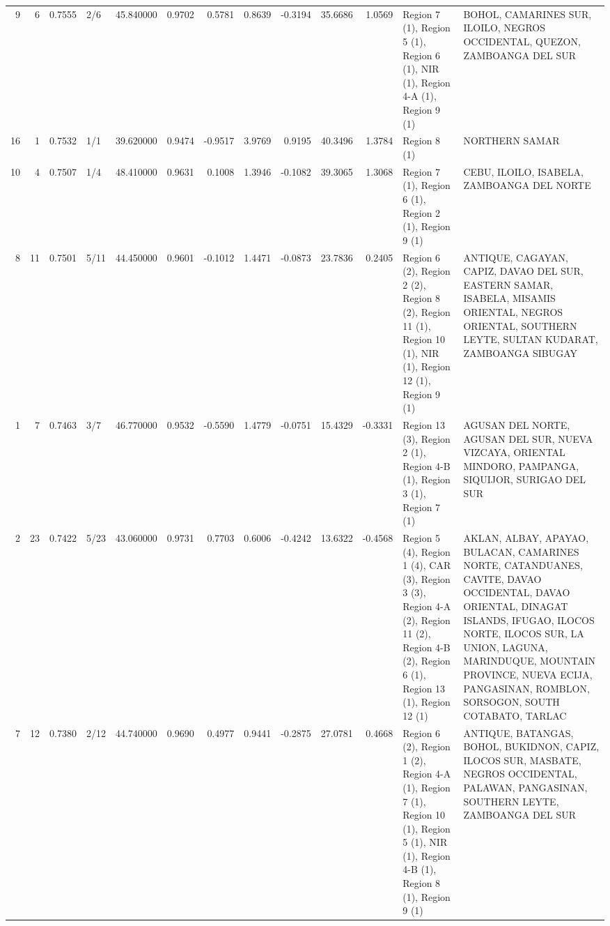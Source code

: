 \begin{tabular}{rrrlrrrrrrrll}
9 & 6 & {\cellcolor[HTML]{E1DAD6}} \color[HTML]{000000} 0.7555 & 2/6 & {\cellcolor[HTML]{F39577}} \color[HTML]{000000} 45.840000 & 0.9702 & 0.5781 & 0.8639 & -0.3194 & 35.6686 & 1.0569 & Region 7 (1), Region 5 (1), Region 6 (1), NIR (1), Region 4-A (1), Region 9 (1) & BOHOL, CAMARINES SUR, ILOILO, NEGROS OCCIDENTAL, QUEZON, ZAMBOANGA DEL SUR \\
16 & 1 & {\cellcolor[HTML]{DDDCDC}} \color[HTML]{000000} 0.7532 & 1/1 & {\cellcolor[HTML]{D3DBE7}} \color[HTML]{000000} 39.620000 & 0.9474 & -0.9517 & 3.9769 & 0.9195 & 40.3496 & 1.3784 & Region 8 (1) & NORTHERN SAMAR \\
10 & 4 & {\cellcolor[HTML]{D9DCE1}} \color[HTML]{000000} 0.7507 & 1/4 & {\cellcolor[HTML]{DA5A49}} \color[HTML]{F1F1F1} 48.410000 & 0.9631 & 0.1008 & 1.3946 & -0.1082 & 39.3065 & 1.3068 & Region 7 (1), Region 6 (1), Region 2 (1), Region 9 (1) & CEBU, ILOILO, ISABELA, ZAMBOANGA DEL NORTE \\
8 & 11 & {\cellcolor[HTML]{D7DCE3}} \color[HTML]{000000} 0.7501 & 5/11 & {\cellcolor[HTML]{F7AF91}} \color[HTML]{000000} 44.450000 & 0.9601 & -0.1012 & 1.4471 & -0.0873 & 23.7836 & 0.2405 & Region 6 (2), Region 2 (2), Region 8 (2), Region 11 (1), Region 10 (1), NIR (1), Region 12 (1), Region 9 (1) & ANTIQUE, CAGAYAN, CAPIZ, DAVAO DEL SUR, EASTERN SAMAR, ISABELA, MISAMIS ORIENTAL, NEGROS ORIENTAL, SOUTHERN LEYTE, SULTAN KUDARAT, ZAMBOANGA SIBUGAY \\
1 & 7 & {\cellcolor[HTML]{D1DAE9}} \color[HTML]{000000} 0.7463 & 3/7 & {\cellcolor[HTML]{EC8165}} \color[HTML]{F1F1F1} 46.770000 & 0.9532 & -0.5590 & 1.4779 & -0.0751 & 15.4329 & -0.3331 & Region 13 (3), Region 2 (1), Region 4-B (1), Region 3 (1), Region 7 (1) & AGUSAN DEL NORTE, AGUSAN DEL SUR, NUEVA VIZCAYA, ORIENTAL MINDORO, PAMPANGA, SIQUIJOR, SURIGAO DEL SUR \\
2 & 23 & {\cellcolor[HTML]{C7D7F0}} \color[HTML]{000000} 0.7422 & 5/23 & {\cellcolor[HTML]{F5C4AC}} \color[HTML]{000000} 43.060000 & 0.9731 & 0.7703 & 0.6006 & -0.4242 & 13.6322 & -0.4568 & Region 5 (4), Region 1 (4), CAR (3), Region 3 (3), Region 4-A (2), Region 11 (2), Region 4-B (2), Region 6 (1), Region 13 (1), Region 12 (1) & AKLAN, ALBAY, APAYAO, BULACAN, CAMARINES NORTE, CATANDUANES, CAVITE, DAVAO OCCIDENTAL, DAVAO ORIENTAL, DINAGAT ISLANDS, IFUGAO, ILOCOS NORTE, ILOCOS SUR, LA UNION, LAGUNA, MARINDUQUE, MOUNTAIN PROVINCE, NUEVA ECIJA, PANGASINAN, ROMBLON, SORSOGON, SOUTH COTABATO, TARLAC \\
7 & 12 & {\cellcolor[HTML]{BFD3F6}} \color[HTML]{000000} 0.7380 & 2/12 & {\cellcolor[HTML]{F7A98B}} \color[HTML]{000000} 44.740000 & 0.9690 & 0.4977 & 0.9441 & -0.2875 & 27.0781 & 0.4668 & Region 6 (2), Region 1 (2), Region 4-A (1), Region 7 (1), Region 10 (1), Region 5 (1), NIR (1), Region 4-B (1), Region 8 (1), Region 9 (1) & ANTIQUE, BATANGAS, BOHOL, BUKIDNON, CAPIZ, ILOCOS SUR, MASBATE, NEGROS OCCIDENTAL, PALAWAN, PANGASINAN, SOUTHERN LEYTE, ZAMBOANGA DEL SUR \\

\end{tabular}
